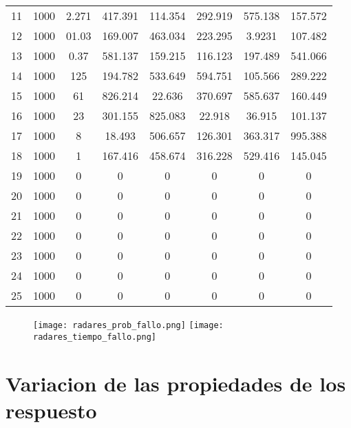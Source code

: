 \begin{table}[h]
{\begin{tabular}{|c|c|c|c|c|c|c|c|}
11 & 1000 & 2.271 & 417.391 & 114.354 & 292.919 & 575.138 & 157.572 \\
12 & 1000 & 01.03 & 169.007 & 463.034 & 223.295 & 3.9231 & 107.482 \\
13 & 1000 & 0.37 & 581.137 & 159.215 & 116.123 & 197.489 & 541.066 \\
14 & 1000 & 125 & 194.782 & 533.649 & 594.751 & 105.566 & 289.222 \\
15 & 1000 & 61 & 826.214 & 22.636 & 370.697 & 585.637 & 160.449 \\
16 & 1000 & 23 & 301.155 & 825.083 & 22.918 & 36.915 & 101.137 \\
17 & 1000 & 8 & 18.493 & 506.657 & 126.301 & 363.317 & 995.388 \\
18 & 1000 & 1 & 167.416 & 458.674 & 316.228 & 529.416 & 145.045 \\
19 & 1000 & 0 & 0 & 0 & 0 & 0 & 0 \\
20 & 1000 & 0 & 0 & 0 & 0 & 0 & 0 \\
21 & 1000 & 0 & 0 & 0 & 0 & 0 & 0 \\
22 & 1000 & 0 & 0 & 0 & 0 & 0 & 0 \\
23 & 1000 & 0 & 0 & 0 & 0 & 0 & 0 \\
24 & 1000 & 0 & 0 & 0 & 0 & 0 & 0 \\
25 & 1000 & 0 & 0 & 0 & 0 & 0 & 0 \\ \hline
\end{tabular}%
}
\end{table}


\begin{figure}[h]
\texttt{[image: radares\_prob\_fallo.png]}
\texttt{[image: radares\_tiempo\_fallo.png]}
\centering
\end{figure}


\section{Variacion de las  propiedades de los respuesto}

